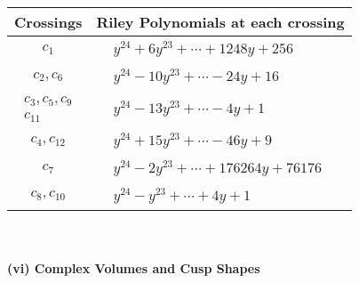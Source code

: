\documentclass[1p]{elsarticle_modified}
\theoremstyle{definition}
\begin{document}
\begin{tabular}{m{50pt}|m{274pt}}
Crossings & \hspace{64pt}Riley Polynomials at each crossing \\
\hline $$\begin{aligned}c_{1}\end{aligned}$$&$\begin{aligned}
&y^{24}+6 y^{23}+\cdots+1248 y+256
\end{aligned}$\\
\hline $$\begin{aligned}c_{2},c_{6}\end{aligned}$$&$\begin{aligned}
&y^{24}-10 y^{23}+\cdots-24 y+16
\end{aligned}$\\
\hline $$\begin{aligned}c_{3},c_{5},c_{9}\\c_{11}\end{aligned}$$&$\begin{aligned}
&y^{24}-13 y^{23}+\cdots-4 y+1
\end{aligned}$\\
\hline $$\begin{aligned}c_{4},c_{12}\end{aligned}$$&$\begin{aligned}
&y^{24}+15 y^{23}+\cdots-46 y+9
\end{aligned}$\\
\hline $$\begin{aligned}c_{7}\end{aligned}$$&$\begin{aligned}
&y^{24}-2 y^{23}+\cdots+176264 y+76176
\end{aligned}$\\
\hline $$\begin{aligned}c_{8},c_{10}\end{aligned}$$&$\begin{aligned}
&y^{24}- y^{23}+\cdots+4 y+1
\end{aligned}$\\
\hline
\end{tabular}\\~\\
\newpage\flushleft \textbf{(vi) Complex Volumes and Cusp Shapes}
\end{document}
